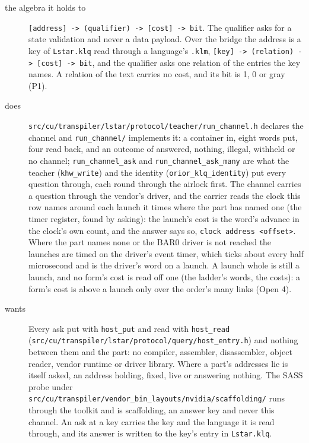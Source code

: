\begin{description}
\item[{the algebra it holds to}] \texttt{[address] -\allowbreak{}> (qualifier) -\allowbreak{}> [cost] -\allowbreak{}> bit}. The qualifier asks for a state validation and never a data payload. Over the bridge the address is a key of \texttt{Lstar.\allowbreak{}klq} read through a language's \texttt{.\allowbreak{}klm}, \texttt{[key] -\allowbreak{}> (relation) -\allowbreak{}> [cost] -\allowbreak{}> bit}, and the qualifier asks one relation of the entries the key names. A relation of the text carries no cost, and its bit is 1, 0 or gray (P1).
\item[{does}] \texttt{src/\allowbreak{}cu/\allowbreak{}transpiler/\allowbreak{}lstar/\allowbreak{}protocol/\allowbreak{}teacher/\allowbreak{}run\_\allowbreak{}channel.\allowbreak{}h} declares the channel and \texttt{run\_\allowbreak{}channel/\allowbreak{}} implements it: a container in, eight words put, four read back, and an outcome of answered, nothing, illegal, withheld or no channel; \texttt{run\_\allowbreak{}channel\_\allowbreak{}ask} and \texttt{run\_\allowbreak{}channel\_\allowbreak{}ask\_\allowbreak{}many} are what the teacher (\texttt{khw\_\allowbreak{}write}) and the identity (\texttt{orior\_\allowbreak{}klq\_\allowbreak{}identity}) put every question through, each round through the airlock first. The channel carries a question through the vendor's driver, and the carrier reads the clock this row names around each launch it times where the part has named one (the timer register, found by asking): the launch's cost is the word's advance in the clock's own count, and the answer says so, \texttt{clock address <offset>}. Where the part names none or the BAR0 driver is not reached the launches are timed on the driver's event timer, which ticks about every half microsecond and is the driver's word on a launch. A launch whole is still a launch, and no form's cost is read off one (the ladder's words, the costs): a form's cost is above a launch only over the order's many links (Open 4).
\item[{wants}] Every ask put with \texttt{host\_\allowbreak{}put} and read with \texttt{host\_\allowbreak{}read} (\texttt{src/\allowbreak{}cu/\allowbreak{}transpiler/\allowbreak{}lstar/\allowbreak{}protocol/\allowbreak{}query/\allowbreak{}host\_\allowbreak{}entry.\allowbreak{}h}) and nothing between them and the part: no compiler, assembler, disassembler, object reader, vendor runtime or driver library. Where a part's addresses lie is itself asked, an address holding, fixed, live or answering nothing. The SASS probe under \texttt{src/\allowbreak{}cu/\allowbreak{}transpiler/\allowbreak{}vendor\_\allowbreak{}bin\_\allowbreak{}layouts/\allowbreak{}nvidia/\allowbreak{}scaffolding/\allowbreak{}} runs through the toolkit and is scaffolding, an answer key and never this channel. An ask at a key carries the key and the language it is read through, and its answer is written to the key's entry in \texttt{Lstar.\allowbreak{}klq}.

\end{description}
